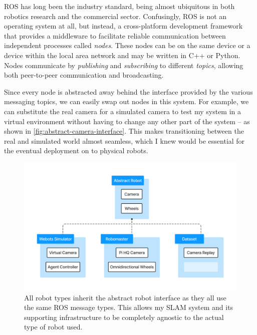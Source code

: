 ROS has long been the industry standard, being almost ubiquitous in both robotics research and the commercial sector. Confusingly, ROS is not an operating system at all, but instead, a cross-platform development framework that provides a middleware to facilitate reliable communication between independent processes called \textit{nodes}. These nodes can be on the same device or a device within the local area network and may be written in C++ or Python. Nodes communicate by \textit{publishing} and \textit{subscribing} to different \textit{topics}, allowing both peer-to-peer communication and broadcasting.



Since every node is abstracted away behind the interface provided by the various messaging topics, we can easily swap out nodes in this system. For example, we can substitute the real camera for a simulated camera to test my system in a virtual environment without having to change any other part of the system – as shown in \autoref{fig:abstract-camera-interface}. This makes transitioning between the real and simulated world almost seamless, which I knew would be essential for the eventual deployment on to physical robots.

\begin{figure}[h]
    \centering
    \includegraphics[trim=5cm 5cm 5cm 5cm, scale=0.15]{figures/abstract_camera_interface.pdf}

    \caption{All robot types inherit the abstract robot interface as they all use the same ROS message types. This allows my SLAM system and its supporting infrastructure to be completely agnostic to the actual type of robot used.}
    \label{fig:abstract-camera-interface}
\end{figure}

